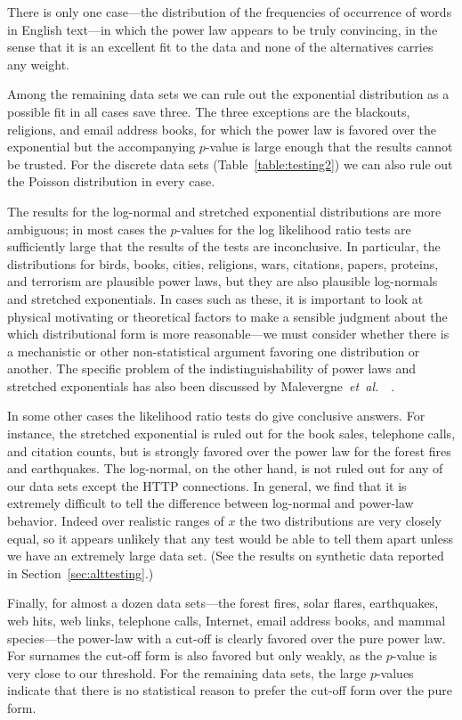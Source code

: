 \documentclass[final]{siamltex}
\newcommand{\etal}{\textit{et~al.}}
\begin{document}
There is only one case---the distribution of the frequencies of occurrence
of words in English text---in which the power law appears to be truly
convincing, in the sense that it is an excellent fit to the data and none
of the alternatives carries any weight.

Among the remaining data sets we can rule out the exponential distribution
as a possible fit in all cases save three.  The three exceptions are the
blackouts, religions, and email address books, for which the power law is
favored over the exponential but the accompanying $p$-value is large enough
that the results cannot be trusted.  For the discrete data sets
(Table~\ref{table:testing2}) we can also rule out the Poisson distribution
in every case.

The results for the log-normal and stretched exponential distributions are
more ambiguous; in most cases the $p$-values for the log likelihood ratio
tests are sufficiently large that the results of the tests are
inconclusive.  In particular, the distributions for birds, books, cities,
religions, wars, citations, papers, proteins, and terrorism are plausible
power laws, but they are also plausible log-normals and stretched
exponentials.  In cases such as these, it is important to look at physical
motivating or theoretical factors to make a sensible judgment about the
which distributional form is more reasonable---we must consider whether
there is a mechanistic or other non-statistical argument favoring one
distribution or another.  The specific problem of the indistinguishability
of power laws and stretched exponentials has also been discussed by
Malevergne~\etal~~\cite{Malevergne-etal-stretched-exp}.

In some other cases the likelihood ratio tests do give conclusive answers.
For instance, the stretched exponential is ruled out for the book sales,
telephone calls, and citation counts, but is strongly favored over the
power law for the forest fires and earthquakes.  The log-normal, on the
other hand, is not ruled out for any of our data sets except the HTTP
connections.  In general, we find that it is extremely difficult to tell
the difference between log-normal and power-law behavior.  Indeed over
realistic ranges of $x$ the two distributions are very closely equal, so it
appears unlikely that any test would be able to tell them apart unless we
have an extremely large data set.  (See the results on synthetic data
reported in Section~\ref{sec:alttesting}.)

Finally, for almost a dozen data sets---the forest fires, solar flares,
earthquakes, web hits, web links, telephone calls, Internet, email address
books, and mammal species---the power-law with a cut-off is clearly favored
over the pure power law.  For surnames the cut-off form is also favored but
only weakly, as the $p$-value is very close to our threshold.  For the
remaining data sets, the large $p$-values indicate that there is no
statistical reason to prefer the cut-off form over the pure form.
\end{document}
